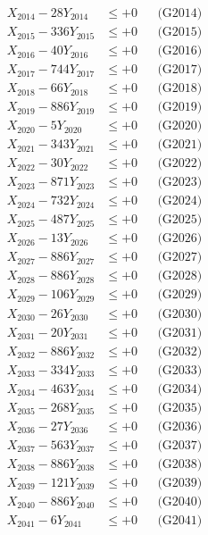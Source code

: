 \documentclass[a4paper,10pt]{article}
\begin{document}
{\begin{align}
X_{2014} - 28Y_{2014} &\leq +0 && \text{(G2014)} \\
X_{2015} - 336Y_{2015} &\leq +0 && \text{(G2015)} \\
X_{2016} - 40Y_{2016} &\leq +0 && \text{(G2016)} \\
X_{2017} - 744Y_{2017} &\leq +0 && \text{(G2017)} \\
X_{2018} - 66Y_{2018} &\leq +0 && \text{(G2018)} \\
X_{2019} - 886Y_{2019} &\leq +0 && \text{(G2019)} \\
X_{2020} - 5Y_{2020} &\leq +0 && \text{(G2020)} \\
\allowbreak
X_{2021} - 343Y_{2021} &\leq +0 && \text{(G2021)} \\
X_{2022} - 30Y_{2022} &\leq +0 && \text{(G2022)} \\
X_{2023} - 871Y_{2023} &\leq +0 && \text{(G2023)} \\
X_{2024} - 732Y_{2024} &\leq +0 && \text{(G2024)} \\
X_{2025} - 487Y_{2025} &\leq +0 && \text{(G2025)} \\
X_{2026} - 13Y_{2026} &\leq +0 && \text{(G2026)} \\
X_{2027} - 886Y_{2027} &\leq +0 && \text{(G2027)} \\
X_{2028} - 886Y_{2028} &\leq +0 && \text{(G2028)} \\
X_{2029} - 106Y_{2029} &\leq +0 && \text{(G2029)} \\
X_{2030} - 26Y_{2030} &\leq +0 && \text{(G2030)} \\
\allowbreak
X_{2031} - 20Y_{2031} &\leq +0 && \text{(G2031)} \\
X_{2032} - 886Y_{2032} &\leq +0 && \text{(G2032)} \\
X_{2033} - 334Y_{2033} &\leq +0 && \text{(G2033)} \\
X_{2034} - 463Y_{2034} &\leq +0 && \text{(G2034)} \\
X_{2035} - 268Y_{2035} &\leq +0 && \text{(G2035)} \\
X_{2036} - 27Y_{2036} &\leq +0 && \text{(G2036)} \\
X_{2037} - 563Y_{2037} &\leq +0 && \text{(G2037)} \\
X_{2038} - 886Y_{2038} &\leq +0 && \text{(G2038)} \\
X_{2039} - 121Y_{2039} &\leq +0 && \text{(G2039)} \\
X_{2040} - 886Y_{2040} &\leq +0 && \text{(G2040)} \\
\allowbreak
X_{2041} - 6Y_{2041} &\leq +0 && \text{(G2041)} \\

\end{align}}
\end{document}

